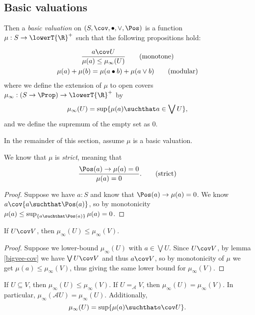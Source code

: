 \subsection{Basic valuations}

Then a \emph{basic valuation} on $(S, \cov, \bullet, \vee, \Pos)$ is a function $\mu : S \to \lowerT{\R}^+$ such that the following propositions hold:

\begin{gather*}
\frac
{a \cov U}
{\mu(a) \le \mu_\infty(U) }
\tag{monotone}
\\
\mu(a) + \mu(b) = \mu(a \bullet b) + \mu(a \vee b)
\tag{modular}
\end{gather*}
where we define the extension of $\mu$ to open covers $\mu_\infty : (S \to \Prop) \to \lowerT{\R}^+$ by
\[
\mu_\infty(U) = \sup \{ \mu(a) \suchthat a \in \bigvee U \},
\]
and we define the supremum of the empty set as 0.

In the remainder of this section, assume $\mu$ is a basic valuation.

\begin{lemma}
We know that $\mu$ is \emph{strict}, meaning that
\[
\frac
{\Pos(a) \to \mu(a) = 0}
{\mu(a) = 0}.
\tag{strict}
\]
\end{lemma}
\begin{proof}
Suppose we have $a : S$ and know that $\Pos(a) \to \mu(a) = 0$. We know $a \cov \{ a \suchthat \Pos(a) \}$, so by monotonicity $\mu(a) \le \sup_{\{a \suchthat \Pos(a)\}} \mu(a) = 0$.
\end{proof}

\begin{lemma}
If $U \cov V$, then $\mu_\infty(U) \le \mu_\infty(V)$.
\end{lemma}
\begin{proof}
Suppose we lower-bound $\mu_\infty(U)$ with $a \in \bigvee U$. Since $U \cov V$, by lemma \ref{bigvee-cov} we have $\bigvee U \cov V$ and thus $a \cov V$, so by monotonicity of $\mu$ we get $\mu(a) \le \mu_\infty(V)$, thus giving the same lower bound for $\mu_\infty(V)$.
\end{proof}

\begin{corrolary}
If $U \subseteq V$, then $\mu_\infty(U) \le \mu_\infty(V)$. If $U =_\mathcal{A} V$, then $\mu_\infty(U) = \mu_\infty(V)$. In particular, $\mu_\infty(\mathcal{A}U) = \mu_\infty(U)$. Additionally,
\[
\mu_\infty(U) = \sup \{\mu(a) \suchthat a \cov U \}.
\]
\end{corrolary}

